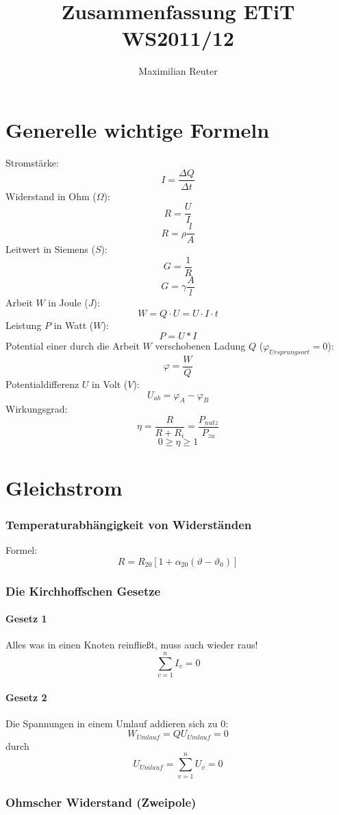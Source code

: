\documentclass[12pt,a4paper]{article}
\title{Zusammenfassung ETiT WS2011/12}
\author{Maximilian Reuter}
\begin{document}
\maketitle
\tableofcontents
\newpage

\part{Generelle wichtige Formeln}
Stromstärke:
\[I = \frac{\Delta Q}{\Delta t}\]
Widerstand in Ohm ($\Omega$):
\[R=\frac{U}{I}\]
\[R = \rho \frac{l}{A}\] 
Leitwert in Siemens ($S$):
\[G = \frac{1}{R}\]
\[G = \gamma \frac{A}{l}\]
Arbeit $W$ in Joule ($J$):
\[W = Q \cdot U = U\cdot I \cdot t\]
Leistung $P$ in Watt ($W$):
\[P = U*I\]
Potential einer durch die Arbeit $W$ verschobenen Ladung $Q$ ($\varphi_{Ursprungsort} = 0$):
\[\varphi = \frac{W}{Q}\]
Potentialdifferenz $U$ in Volt ($V$):
\[U_{ab} = \varphi_A - \varphi_B\]
Wirkungsgrad:
\[\eta = \frac{R}{R+R_i} = \frac{P_{nutz}}{P_{zu}}\]
\[0\geq \eta \geq 1\]

\part{Gleichstrom}
\section{Temperaturabhängigkeit von Widerständen}
Formel:\\
\[R = R_{20}[1+\alpha_{20}(\vartheta-\vartheta_0)]\]

\section{Die Kirchhoffschen Gesetze}
\subsection{Gesetz 1}
Alles was in einen Knoten reinfließt, muss auch wieder raus!
\[\sum_{v=1}^n I_v = 0\]

\subsection{Gesetz 2}
Die Spannungen in einem Umlauf addieren sich zu 0:
\[W_{Umlauf} = QU_{Umlauf} = 0\]
durch 
\[U_{Umlauf}= \sum_{v=1}^n U_v = 0\]

\section{Ohmscher Widerstand (Zweipole)}
\end{document}
